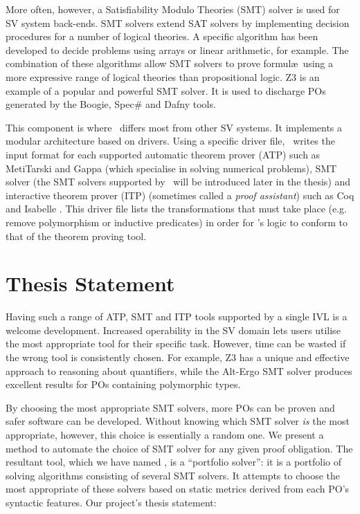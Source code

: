 More often, however, a Satisfiability Modulo Theories (SMT) solver is used for SV system back-ends. SMT solvers extend SAT solvers by implementing decision procedures for a number of logical theories. A specific algorithm has been developed to decide problems using arrays or linear arithmetic, for example. The combination of these algorithms allow SMT solvers to prove formul\ae~using a more expressive range of logical theories than propositional logic. Z3 \cite{Z3} is an example of a popular and powerful SMT solver. It is used to discharge POs generated by the Boogie, Spec\# and Dafny tools. 

This component is where \why~differs most from other SV systems.
It implements a modular architecture based on drivers.
Using a specific driver file, \why~writes the input format for each supported automatic theorem prover (ATP) such as MetiTarski \cite{Akbarpour2008} and Gappa \cite{gappa} (which specialise in solving numerical problems), SMT solver (the SMT solvers supported by \why~will be introduced later in the thesis) and interactive theorem prover (ITP) (sometimes called a \textit{proof assistant}) such as Coq \cite{Coq} and Isabelle \cite{Isabelle}.
This driver file lists the transformations that must take place (e.g. remove polymorphism or inductive predicates) in order for \why's logic to conform to that of the theorem proving tool.

\section{Thesis Statement}

Having such a range of ATP, SMT and ITP tools supported by a single IVL is a welcome development.
Increased operability in the SV domain lets users utilise the most appropriate tool for their specific task.
However, time can be wasted if the wrong tool is consistently chosen. 
For example, Z3 has a unique and effective approach to reasoning about quantifiers, while the Alt-Ergo \cite{AltErgo} SMT solver produces excellent results for POs containing polymorphic types.

By choosing the most appropriate SMT solvers, more POs can be proven and safer software can be developed.
Without knowing which SMT solver \textit{is} the most appropriate, however, this choice is essentially a random one.
We present a method to automate the choice of SMT solver for any given proof obligation.
The resultant tool, which we have named \where, is a ``portfolio solver'': it is a portfolio of solving algorithms consisting of several SMT solvers.
It attempts to choose the most appropriate of these solvers based on static metrics derived from each PO's syntactic features.  
Our project's thesis statement: 
 
